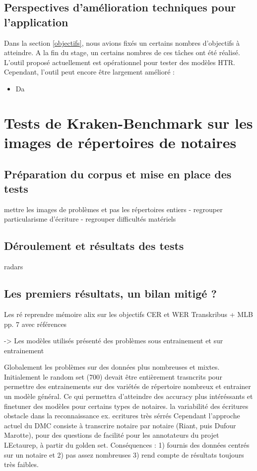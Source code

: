 \newpage
\section{Perspectives d'amélioration techniques pour l'application}\label{perspectives_amélios}

Dans la section \ref{objectifs}, nous avions fixés un certains nombres d'objectifs à atteindre. A la fin du stage, un certains nombres de ces tâches ont été réalisé. L'outil proposé actuellement est opérationnel pour tester des modèles HTR. Cependant, l'outil peut encore être largement amélioré :
\begin{itemize}
    \item Da
\end{itemize}



\chapter{Tests de Kraken-Benchmark sur les images de répertoires de notaires}\label{tests_KB_lectaurep}
\section{Préparation du corpus et mise en place des tests}
mettre les images de problèmes et pas les répertoires entiers 
- regrouper particularisme d'écriture 
- regrouper difficultés matériels 

\section{Déroulement et résultats des tests}

radars 


\section{Les premiers résultats, un bilan mitigé ?}



Les ré
reprendre mémoire alix sur les objectifs  CER et WER Transkribus + MLB pp. 7 avec références

-> Les modèles utilisés présenté des problèmes sous entrainement et sur entrainement



Globalement les problèmes sur des données plus nombreuses et mixtes. Initialement le random set (700) devait être entièrement trasncrits 
pour permettre des entrainements sur des variétés de répertoire nombreux et entrainer un modèle général. Ce qui permettra d'atteindre des accuracy plus intéréssants et finetuner des modèles pour certains types de notaires. 
la variabilité des écritures obstacle dans la reconnaissance ex. ecritures très sérrés
Cependant l'approche actuel du DMC consiste à transcrire notaire par notaire (Riant, puis Dufour Marotte), pour des questions de facilité pour les annotateurs du projet LEctaurep, à partir du golden set. Conséquences : 1) fournis des données centrés sur un notaire et 2) pas assez nombreuses 3) rend compte de résultats toujours très faibles. 

